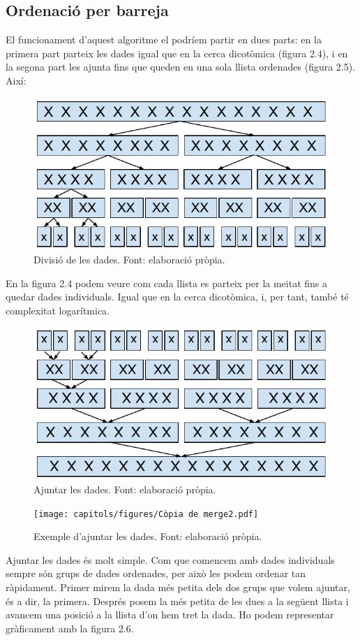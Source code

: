 \subsection{Ordenació per barreja} %
El funcionament d'aquest algoritme el podríem partir en dues parts: en la primera part parteix les dades igual que en la cerca dicotòmica (figura 2.4), i en la segona part les ajunta fins que queden en una sola llista ordenades (figura 2.5). Així:

\begin{figure}[H]
    \centering
    \includegraphics[width=.6\textwidth]{capitols/figures/merge.pdf}
    \caption[Divisió de les dades.]{Divisió de les dades. Font: elaboració pròpia.}
    \label{fig:my_label}
\end{figure}
\vspace{-.8cm}
En la figura 2.4 podem veure com cada llista es parteix per la meitat fins a quedar dades individuals. Igual que en la cerca dicotòmica, i, per tant, també té complexitat logarítmica.
\begin{figure}[H]
    \centering
    \includegraphics[width=.6\textwidth]{capitols/figures/merge2.pdf}
    \caption[Ajuntar les dades.]{Ajuntar les dades. Font: elaboració pròpia.}
    \label{fig:my_label}
\end{figure}
\vspace{-.5cm}
\begin{figure}
\vspace{-18pt}
    \centering
    \texttt{[image: capitols/figures/Còpia de merge2.pdf]}
    \caption[Exemple d'ajuntar les dades.]{Exemple d'ajuntar les dades. Font: elaboració pròpia.}
    \label{fig:my_label}
\end{figure}
Ajuntar les dades és molt simple. Com que comencem amb dades individuals sempre són grups de dades ordenades, per això les podem ordenar tan ràpidament. Primer mirem la dada més petita dels dos grups que volem ajuntar, és a dir, la primera. Després posem la més petita de les dues a la següent llista i avancem una posició a la llista d'on hem tret la dada. Ho podem representar gràficament amb la figura 2.6.

